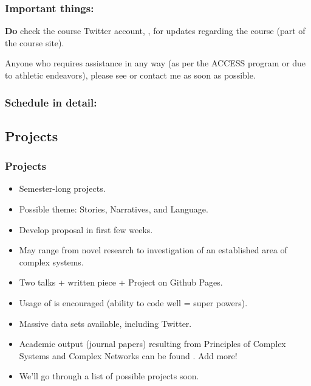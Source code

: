 \begin{frame}
  \frametitle{Important things:}

  \begin{block}{}
    \importantdates
  \end{block}

  \begin{block}{}
    \textbf{Do} check the course Twitter account, \coursehandle, for
    updates regarding the course (part of the course site).
  \end{block}

  \begin{block}{}
     Anyone who requires assistance in any way 
    (as per the ACCESS program
    or due to athletic endeavors), please see or contact me as soon as possible.
  \end{block}

\end{frame}

\begin{frame}[plain]
  \frametitle{Schedule in detail:}

  \tiny
  \begin{block}{}
    \settablerowcolours
    \lectureschedule
  \end{block}

\end{frame}

\subsection{Projects}

\begin{frame}
  \frametitle{Projects}

  \begin{block}{}
  \begin{itemize}
  \item<+->
    Semester-long projects.
  \item<+-> 
    Possible theme: Stories, Narratives, and Language.
  \item<+-> 
    Develop proposal in first few weeks.
  \item<+-> 
    May range from novel research to investigation of an established area of complex systems.
  \item<+-> 
    Two talks + written piece + Project on Github Pages.
  \item<+->
    Usage of 
    is encouraged (ability to code well = super powers).
  \item<+->
    Massive data sets available, including Twitter.
  \item<+->
    Academic output (journal papers) resulting from Principles
    of Complex Systems and Complex Networks can be found
    .  Add more!
  \item<+->
    We'll go through a list of possible projects soon.
  \end{itemize}
  \end{block}

\end{frame}

